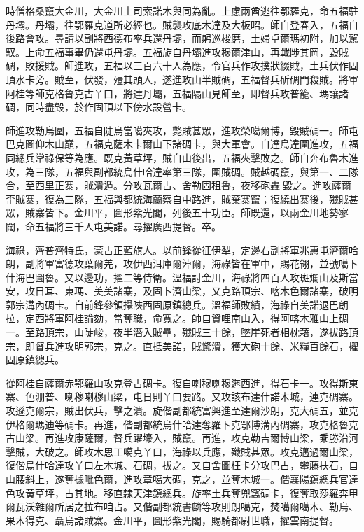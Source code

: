 \begin{pinyinscope}
時僧格桑竄大金川，大金川土司索諾木與同為亂。上慮兩酋逃往鄂羅克，命五福駐丹壩。丹壩，往鄂羅克道所必經也。賊襲攻底木達及大板昭。師自登春入，五福自後路會攻。尋請以副將西德布率兵還丹壩，而躬巡梭磨，土婦卓爾瑪初附，加以駕馭。上命五福事畢仍還屯丹壩。五福旋自丹壩進攻穆爾津山，再戰陟其岡，毀賊碉，敗援賊。師進攻，五福以三百六十人為應，令官兵作攻撲狀綴賊，土兵伏作固頂水卡旁。賊至，伏發，殪其頭人，遂進攻山半賊碉，五福督兵斫碉門殺賊。將軍阿桂等師克格魯克古丫口，將達丹壩，五福隔山見師至，即督兵攻普籠、瑪讓諸碉，同時盡毀，於作固頂以下傍水設營卡。

師進攻勒烏圍，五福自陡烏當噶夾攻，斃賊甚眾，進攻榮噶爾博，毀賊碉一。師屯巴克圖仰木山巔，五福克薩木卡爾山下諸碉卡，與大軍會。自達烏達圍進攻，五福同總兵常祿保等為應。既克黃草坪，賊自山後出，五福夾擊敗之。師自奔布魯木進攻，為三隊，五福與副都統烏什哈達率第三隊，圍賊碉。賊越碉竄，與第一、二隊合，至西里正寨，賊潰遁。分攻瓦爾占、舍勒固租魯，夜移砲轟毀之。進攻薩爾歪賊寨，復為三隊，五福與都統海蘭察自中路進，賊棄寨竄；復繞出寨後，殲賊甚眾，賊寨皆下。金川平，圖形紫光閣，列後五十功臣。師既還，以兩金川地勢寥闊，命五福將三千人屯美諾。尋擢廣西提督。卒。

海祿，齊普齊特氏，蒙古正藍旗人。以前鋒從征伊犁，定邊右副將軍兆惠屯濟爾哈朗，副將軍富德攻葉爾羌，攻伊西洱庫爾淖爾，海祿皆在軍中，賜花翎，並號噶卜什海巴圖魯。又以邊功，擢二等侍衛。溫福討金川，海祿將四百人攻斑斕山及斯當安，攻日耳、東瑪、美美諸寨，及固卜濟山梁，又克路頂宗、喀木色爾諸寨，破明郭宗溝內碉卡。自前鋒參領攝陜西固原鎮總兵。溫福師敗績，海祿自美諾退巴朗拉，定西將軍阿桂論劾，當奪職，命寬之。師自資哩南山入，得阿喀木雅山上碉一。至路頂宗，山陡峻，夜半潛入賊壘，殲賊三十餘，墜崖死者相枕藉，遂拔路頂宗，即督兵進攻明郭宗，克之。直抵美諾，賊驚潰，獲大砲十餘、米糧百餘石，擢固原鎮總兵。

從阿桂自薩爾赤鄂羅山攻克登古碉卡。復自喇穆喇穆迤西進，得石卡一。攻得斯東寨、色淜普、喇穆喇穆山梁，屯日則丫口要路。又攻該布達什諾木城，連克碉寨。攻遜克爾宗，賊出伏兵，擊之潰。旋偕副都統富興進至達爾沙朗，克大碉五，並克伊格爾瑪迪等碉卡。再進，偕副都統烏什哈達奪羅卜克鄂博溝內碉寨，攻克格魯克古山梁。再進攻康薩爾，督兵躍壕入，賊竄。再進，攻克勒吉爾博山梁，乘勝沿河擊賊，大破之。師攻木思工噶克丫口，海祿以兵應，殲賊甚眾。攻克邁過爾山梁，復偕烏什哈達攻丫口左木城、石碉，拔之。又自舍圖枉卡分攻巴占，攀藤扶石，自山腰斜上，遂奪據毗色爾，進攻章噶大碉，克之，並奪木城一。偕襄陽鎮總兵官達色攻黃草坪，占其地。移直隸天津鎮總兵。旋率土兵奪兜窩碉卡，復奪取莎羅奔甲爾瓦沃雜爾所居之拉布咱占。又偕副都統書麟等攻則朗噶克，焚噶爾噶木、勒烏、果木得克、聶烏諸賊寨。金川平，圖形紫光閣，賜騎都尉世職，擢雲南提督。


\end{pinyinscope}
